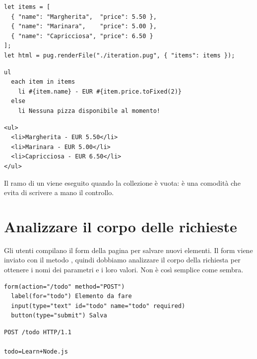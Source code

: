 \begin{lstlisting}[style=js]
let items = [
  { "name": "Margherita",  "price": 5.50 },
  { "name": "Marinara",    "price": 5.00 },
  { "name": "Capricciosa", "price": 6.50 }
];
let html = pug.renderFile("./iteration.pug", { "items": items });
\end{lstlisting}

\begin{lstlisting}[style=pug, name=iteration.pug]
ul
  each item in items
    li #{item.name} - EUR #{item.price.toFixed(2)}
  else
    li Nessuna pizza disponibile al momento!
\end{lstlisting}

\begin{lstlisting}[style=html, name=output.html]
<ul>
  <li>Margherita - EUR 5.50</li>
  <li>Marinara - EUR 5.00</li>
  <li>Capricciosa - EUR 6.50</li>
</ul>
\end{lstlisting}

Il ramo  di un  viene eseguito quando la collezione è
vuota: è una comodità che evita di scrivere a mano il controllo.


\section{Analizzare il corpo delle richieste}

Gli utenti compilano il form della pagina per salvare nuovi elementi. Il form
viene inviato con il metodo , quindi dobbiamo analizzare il corpo
della richiesta per ottenere i nomi dei parametri e i loro valori. Non è così
semplice come sembra.

\begin{lstlisting}[style=pug, name=todo.pug]
form(action="/todo" method="POST")
  label(for="todo") Elemento da fare
  input(type="text" id="todo" name="todo" required)
  button(type="submit") Salva
\end{lstlisting}

\begin{lstlisting}[style=http, name=Richiesta generata]
POST /todo HTTP/1.1

todo=Learn+Node.js
\end{lstlisting}


